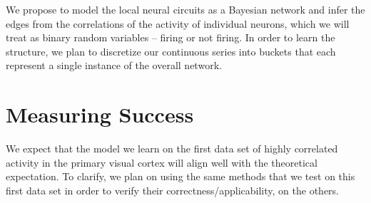 \documentclass{article}
\begin{document}
We propose to model the local neural circuits as a Bayesian network and infer 
the edges from the correlations of the activity of individual neurons, which 
we will treat as binary random variables – firing or not firing. In order to 
learn the structure, we plan to discretize our continuous series into buckets 
that each represent a single instance of the overall network. \par

\section*{Measuring Success}

We expect that the model we learn on the first data set of highly correlated 
activity in the primary visual cortex will align well with the theoretical 
expectation. To clarify, we plan on using the same methods that we test on 
this first data set in order to verify their correctness/applicability, on the 
others. \par
\end{document}
